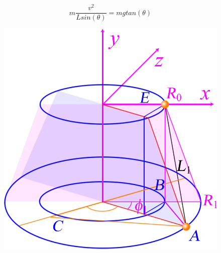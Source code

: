 \documentclass[12pt,a4paper]{ctexart}
\begin{document}
	$$m\frac{v^2}{Lsin(\theta)}=mgtan(\theta)$$
	\begin{figure}[h] %
	\centering %
	\includegraphics[height=16\baselineskip]{T800.png} %
\end{figure}%
	
	
	
	
\end{document}
